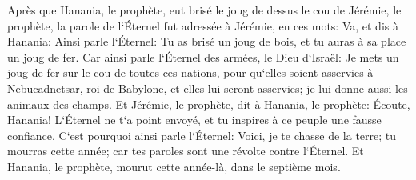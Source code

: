 \verse Après que Hanania, le prophète, eut brisé le joug de dessus le cou de Jérémie, le prophète, la parole de l`Éternel fut adressée à Jérémie, en ces mots: 
\verse Va, et dis à Hanania: Ainsi parle l`Éternel: Tu as brisé un joug de bois, et tu auras à sa place un joug de fer. 
\verse Car ainsi parle l`Éternel des armées, le Dieu d`Israël: Je mets un joug de fer sur le cou de toutes ces nations, pour qu`elles soient asservies à Nebucadnetsar, roi de Babylone, et elles lui seront asservies; je lui donne aussi les animaux des champs. 
\verse Et Jérémie, le prophète, dit à Hanania, le prophète: Écoute, Hanania! L`Éternel ne t`a point envoyé, et tu inspires à ce peuple une fausse confiance. 
\verse C`est pourquoi ainsi parle l`Éternel: Voici, je te chasse de la terre; tu mourras cette année; car tes paroles sont une révolte contre l`Éternel. 
\verse Et Hanania, le prophète, mourut cette année-là, dans le septième mois. 

